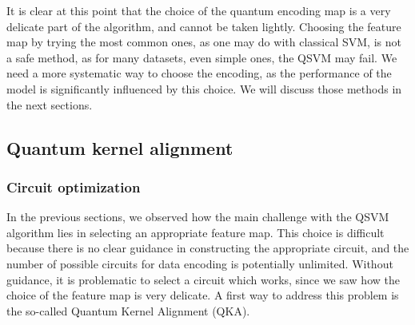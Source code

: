 \documentclass[12pt]{article}
\begin{document}
It is clear at this point that the choice of the quantum encoding map is a very delicate part of the algorithm, and cannot be taken lightly. Choosing the feature map by trying the most common ones, as one may do with classical SVM, is not a safe method, as for many datasets, even simple ones, the QSVM may fail. We need a more systematic way to choose the encoding, as the performance of the model is significantly influenced by this choice. We will discuss those methods in the next sections.

\subsection{Quantum kernel alignment}
\subsubsection{Circuit optimization}

In the previous sections, we observed how the main challenge with the QSVM algorithm lies in selecting an appropriate feature map. This choice is difficult because there is no clear guidance in constructing the appropriate circuit, and the number of possible circuits for data encoding is potentially unlimited. Without guidance, it is problematic to select a circuit which works, since we saw how the choice of the feature map is very delicate. A first way to address this problem is the so-called Quantum Kernel Alignment (QKA). 
\end{document}

